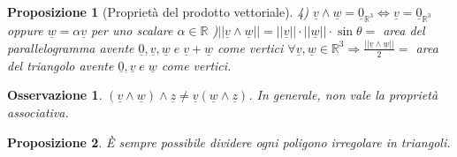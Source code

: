 \documentclass[12pt]{article}
\newenvironment{para}{\begin{adjustwidth}{13mm}{}}{\end{adjustwidth}}
\newtheorem{Proposizione}{Proposizione}[subsection]
\newtheorem{Osservazione}{Osservazione}[subsection]
\begin{document}
\begin{para}
\begin{Proposizione}[Proprietà del prodotto vettoriale]
4) $\underline{v}\land \underline{w} = \underline{0}_{\mathbb{R}^3} \Leftrightarrow \underline{v} = \underline{0}_{\mathbb{R}^3}$ oppure $\underline{w} = \alpha\underline{v}$ per uno scalare $\alpha\in\mathbb{R}$ )$\bigl||\underline{v} \land \underline{w}|\bigr| = \bigl||\underline{v}|\bigr| \cdot \bigl||\underline{w}|\bigr| \cdot \sin{\theta} = $ area del parallelogramma avente $\underline{0}, \underline{v}, \underline{w} \; e \; \underline{v} + \underline{w} $ come vertici $\forall\underline{v},\underline{w} \in \mathbb{R}^3 \Rightarrow \frac{\bigl||\underline{v}\land \underline{w}|\bigr|}{2} = $ area del triangolo avente $\underline{0}, \underline{v} \; e \; \underline{w}$ come vertici.
\end{Proposizione}
\begin{Osservazione}
    $(\underline{v} \land \underline{w}) \land \underline{z} \neq \underline{v}(\underline{w} \land\underline{z})$. In generale, non vale la proprietà associativa.
\end{Osservazione}
\begin{Proposizione}
    È sempre possibile dividere ogni poligono irregolare in triangoli.
\end{Proposizione}

\end{para}
\end{document}
